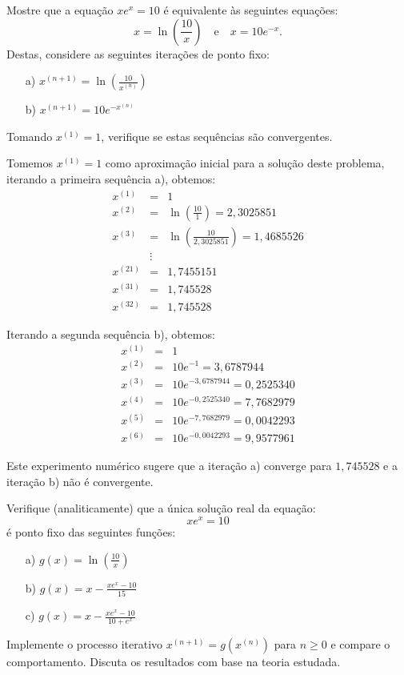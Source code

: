 \begin{exer}
  Mostre que a equação $xe^x = 10$ é equivalente às seguintes equações:
\begin{equation*}
  x=\ln\left(\frac{10}{x}\right)\quad\text{e}\quad x=10e^{-x}.
\end{equation*}
Destas, considere as seguintes iterações de ponto fixo:
\begin{enumerate}
 \item [a)] $\displaystyle x^{(n+1)}=\ln \left(\frac{10}{x^{(n)}}\right)$
 \item [b)] $\displaystyle x^{(n+1)}=10 e^{-x^{(n)}} $
\end{enumerate}
Tomando $x^{(1)} = 1$, verifique se estas sequências são convergentes.
\end{exer}
\begin{resp}
  
Tomemos $x^{(1)}=1$ como aproximação inicial para a solução deste problema, iterando a primeira sequência a), obtemos:
\begin{eqnarray*}
x^{(1)} &=& 1\\
x^{(2)} &=& \ln\left(\frac{10}{1}\right)=2,3025851\\
x^{(3)} &=& \ln\left(\frac{10}{2,3025851}\right)=1,4685526\\
        &\vdots&\\
x^{(21)}&=& 1,7455151\\
x^{(31)}&=& 1,745528\\
x^{(32)}&=& 1,745528
\end{eqnarray*}

Iterando a segunda sequência b), obtemos:
\begin{eqnarray*}
x^{(1)}&=&1\\
x^{(2)}&=&10e^{-1}= 3,6787944   \\
x^{(3)}&=&10e^{- 3,6787944 }= 0,2525340     \\
x^{(4)}&=&10e^{-0,2525340}=  7,7682979      \\
x^{(5)}&=&10e^{-7,7682979}=  0,0042293      \\
x^{(6)}&=&10e^{-0,0042293}=  9,9577961
\end{eqnarray*}

Este experimento numérico sugere que a iteração a) converge para $1,745528$ e a iteração b) não é convergente.    
  
\end{resp}

\begin{exer} Verifique (analiticamente) que a única solução real da equação:
  \begin{equation*}
    xe^x=10
  \end{equation*}
é ponto fixo das seguintes funções:
\begin{itemize}
\item[a)] $g(x)=\ln\left(\frac{10}{x}\right)$
\item[b)] $g(x)=x-\frac{xe^{x}-10}{15}$
\item[c)] $g(x)=x-\frac{xe^{x}-10}{10+e^{x}}$
\end{itemize}
Implemente o processo iterativo $x^{(n+1)}=g(x^{(n)})$ para $n\geq 0$ e compare o comportamento. Discuta os resultados com base na teoria estudada.
\end{exer}

